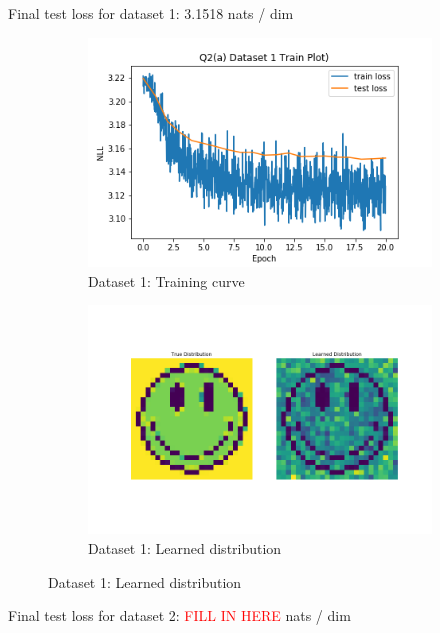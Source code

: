\documentclass{article}
\begin{document}
\begin{enumerate}[(a)]
Final test loss for dataset 1: 3.1518  nats / dim
\begin{figure}[H]
    \centering
    \begin{subfigure}{0.45\textwidth}
        \centering
        \includegraphics[width=\textwidth]{figures/q2_a_dset1_train_plot.png}
        \caption{Dataset 1: Training curve}
    \end{subfigure}
    \hspace{0.2in}
    \begin{subfigure}{0.45\textwidth}
        \centering
        \includegraphics[width=\textwidth]{figures/q2_a_dset1_learned_dist.png}
        \caption{Dataset 1: Learned distribution}
    \end{subfigure}
\end{figure}
Final test loss for dataset 2: \textcolor{red}{FILL IN HERE}  nats / dim
\begin{figure}[H]

\end{figure}
\end{enumerate}
\end{document}
